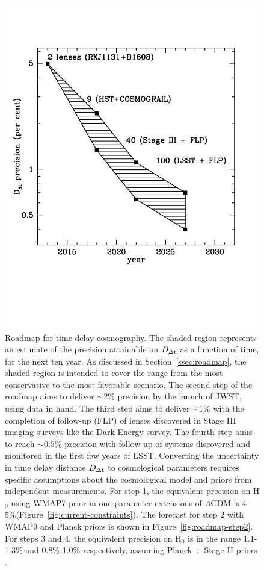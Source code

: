 \begin{figure}
\includegraphics[width=0.98\textwidth]{figures/roadmap.pdf}
\caption{Roadmap for time delay cosmography. The shaded region represents an estimate of the precision attainable on $D_{\Delta{\rm t}}$ as a function of time, for the next ten year. As discussed in Section~\ref{ssec:roadmap}, the shaded region is intended to cover the range from the most conservative to the most favorable scenario. The second step of the roadmap aims to deliver $\sim2\%$ precision by the launch of JWST, using data in hand. The third step aims to deliver $\sim1\%$ with the completion of follow-up (FLP) of lenses discovered in Stage III imaging surveys like the Dark Energy survey. The fourth step aims to reach $\sim0.5\%$ precision with follow-up of systems discovered and monitored in the first few years of LSST. Converting the uncertainty in time delay distance $D_{\Delta{\rm t}}$ to cosmological parameters requires specific assumptions about the cosmological model and priors from independent measurements. For step 1, the equivalent precision on H$_0$ using WMAP7 prior in one parameter extensions of $\Lambda$CDM is 4-5\%(Figure~\ref{fig:current-constraints}). The forecast for step 2 with WMAP9 and Planck priors is shown in Figure~\ref{fig:roadmap-step2}. For steps 3 and 4, the equivalent precision on H$_0$ is in the range 1.1-1.3\% and 0.8\%-1.0\% respectively, assuming Planck + Stage II priors \citep{C+M09b}.}
\label{fig:roadmap}
\end{figure}

